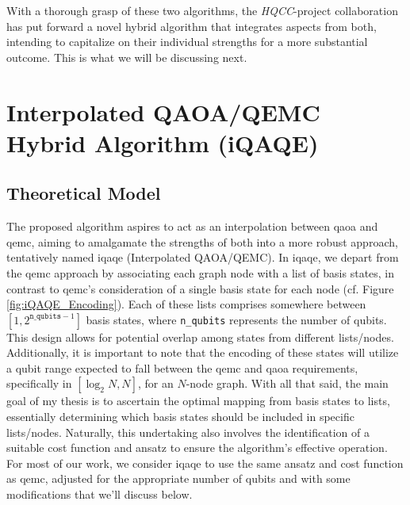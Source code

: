 With a thorough grasp of these two algorithms, the \textit{HQCC}-project collaboration has put forward a novel hybrid algorithm that integrates aspects from both, intending to capitalize on their individual strengths for a more substantial outcome. This is what we will be discussing next.

\section{Interpolated QAOA/QEMC Hybrid Algorithm (iQAQE)}
\label{section:iQAQE}


\subsection{Theoretical Model}
\label{subsection:iQAQE Theoretical Framework}
The proposed algorithm aspires to act as an interpolation between \acrshort{qaoa} and \acrshort{qemc}, aiming to amalgamate the strengths of both into a more robust approach, tentatively named \acrshort{iqaqe} (Interpolated QAOA/QEMC). In \acrshort{iqaqe}, we depart from the \acrshort{qemc} approach by associating each graph node with a list of basis states, in contrast to \acrshort{qemc}'s consideration of a single basis state for each node (cf. Figure \ref{fig:iQAQE_Encoding}). Each of these lists comprises somewhere between $\left[1, 2^{\texttt{n\_qubits}-1}\right]$ basis states, where \texttt{n\_qubits} represents the number of qubits. This design allows for potential overlap among states from different lists/nodes. Additionally, it is important to note that the encoding of these states will utilize a qubit range expected to fall between the \acrshort{qemc} and \acrshort{qaoa} requirements, specifically in $[\log_2{N}, N]$, for an $N$-node graph. With all that said, the main goal of my thesis is to ascertain the optimal mapping from basis states to lists, essentially determining which basis states should be included in specific lists/nodes. Naturally, this undertaking also involves the identification of a suitable cost function and ansatz to ensure the algorithm's effective operation. For most of our work, we consider \acrshort{iqaqe} to use the same ansatz and cost function as \acrshort{qemc}, adjusted for the appropriate number of qubits and with some modifications that we'll discuss below.

